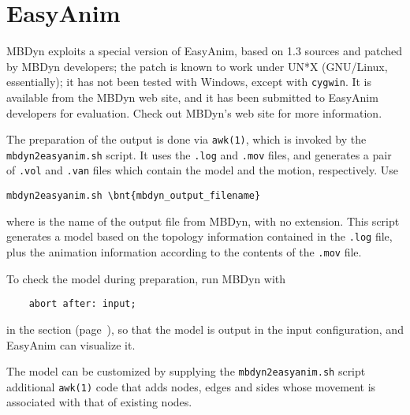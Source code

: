 \section{EasyAnim}
\label{sec:APP:OUTPUTRESULTS:EASYANIM}
MBDyn exploits a special version of EasyAnim, based on 1.3 sources
and patched by MBDyn developers; the patch is known to work under UN*X
(GNU/Linux, essentially); it has not been tested with Windows, except with
\texttt{cygwin}.
It is available from the MBDyn web site, and it has been submitted
to EasyAnim developers for evaluation.
Check out MBDyn's web site for more information.

The preparation of the output is done via \texttt{awk(1)}, which is invoked
by the \texttt{mbdyn2easyanim.sh} script.
It uses the \texttt{.log} and \texttt{.mov} files, and generates a pair of
\texttt{.vol} and \texttt{.van} files which contain the model and the motion,
respectively.
Use
\begin{Verbatim}[commandchars=\\\{\}]
    mbdyn2easyanim.sh \bnt{mbdyn_output_filename}
\end{Verbatim}
where  is the name of the output file from MBDyn,
with no extension.
This script generates a model based on the topology information
contained in the \texttt{.log} file, plus the animation information
according to the contents of the \texttt{.mov} file.

To check the model during preparation, run MBDyn with
\begin{verbatim}
    abort after: input;
\end{verbatim}
in the  section (page~\pageref{sec:IVP:abort after}),
so that the model is output in the input configuration,
and EasyAnim can visualize it.

The model can be customized by supplying the \texttt{mbdyn2easyanim.sh}
script additional \texttt{awk(1)} code that adds nodes, edges and sides 
whose movement is associated with that of existing nodes.


